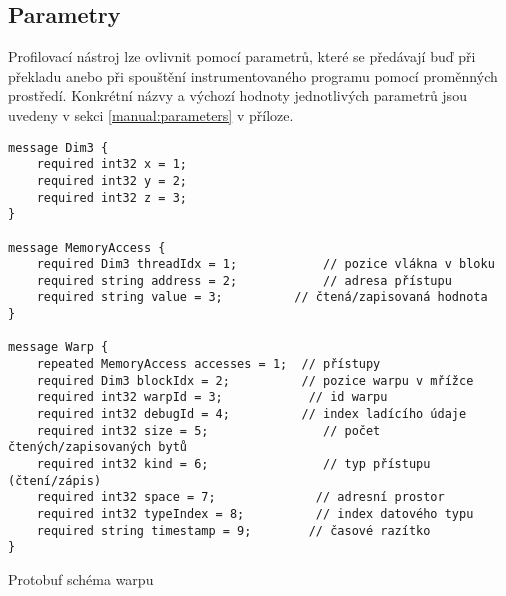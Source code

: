 \subsection{Parametry}
\label{sec:parameters}
Profilovací nástroj lze ovlivnit pomocí parametrů, které se předávají buď při překladu anebo při spouštění instrumentovaného programu pomocí proměnných prostředí. Konkrétní názvy a výchozí hodnoty jednotlivých parametrů jsou uvedeny v sekci \ref{manual:parameters} v příloze.

\begin{listing}
\begin{verbatim}
message Dim3 {
	required int32 x = 1;
	required int32 y = 2;
	required int32 z = 3;
}

message MemoryAccess {
	required Dim3 threadIdx = 1;			// pozice vlákna v bloku
	required string address = 2;			// adresa přístupu
	required string value = 3;	  		// čtená/zapisovaná hodnota
}
	
message Warp {
	repeated MemoryAccess accesses = 1;	 // přístupy
	required Dim3 blockIdx = 2;			 // pozice warpu v mřížce
	required int32 warpId = 3;			  // id warpu
	required int32 debugId = 4;			 // index ladícího údaje
	required int32 size = 5;			    // počet čtených/zapisovaných bytů
	required int32 kind = 6;			    // typ přístupu (čtení/zápis)
	required int32 space = 7;			   // adresní prostor
	required int32 typeIndex = 8;		   // index datového typu
	required string timestamp = 9;		  // časové razítko
}
\end{verbatim}
\caption{Protobuf schéma warpu}
\label{code:protobufaccess}
\end{listing}

